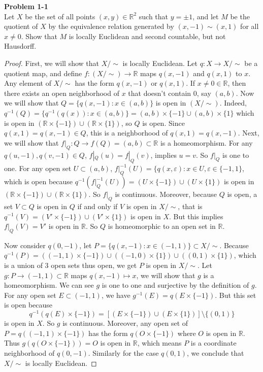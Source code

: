 \documentclass[12pt, a4paper]{article}
\theoremstyle{plain}
\newcommand{\R}{\mathbb{R}}
\def\epsilon{\varepsilon}
\newenvironment{problem}[2][Problem]
    { \begin{mdframed}[backgroundcolor=gray!20] \textbf{#1 #2} \\}
    {  \end{mdframed}}
\begin{document}
\begin{problem}{1-1}
    Let $X$ be the set of all points $(x,y)\in \R^2$ such that $y=\pm1$, and let $M$ be the quotient of $X$ by the equivalence relation generated by $(x,-1)\sim (x,1)$ for all $x\neq 0$. Show that $M$ is locally Euclidean and second countable, but not Hausdorff.
\end{problem}
\begin{proof}
	First, we will show that $X/\sim$ is locally Euclidean. Let $q: X\rightarrow X/\sim$ be a quotient map, and define $f:(X/\sim) \rightarrow \R$ maps $q(x,-1)$ and $q(x,1)$ to $x$. Any element of $X/\sim$ has the form $q(x,-1)$ or $q(x,1)$. If $x\neq 0\in \R$, then there exists an open neighborhood of $x$ that doesn't contain $0$, say $(a,b)$. Now we will show that $Q=\{q(x,-1):x\in (a,b)\}$ is open in $(X/\sim)$. Indeed, $q^{-1}(Q)=\{q^{-1}(q(x)):x\in (a,b)\}=(a,b)\times\{-1\}\cup (a,b)\times \{1\}$ which is open in $(\R\times \{-1\})\cup (\R\times \{1\})$, so $Q$ is open. Since $q(x,1)=q(x,-1)\in Q$, this is a neighborhood of $q(x,1)=q(x,-1)$. Next, we will show that $f|_Q:Q\rightarrow f(Q)=(a,b)\subset \R$ is a homeomorphism. For any $q(u,-1),q(v,-1)\in Q$, $f|_Q(u)=f|_Q(v)$, implies $u=v$. So $f|_Q$ is one to one. For any open set $U\subset (a,b)$, $f|_Q^{-1}(U)= \{q(x,\epsilon):x\in U, \epsilon\in\{-1,1\}$, which is open because $q^{-1}(f|_Q^{-1}(U))=(U\times\{-1\})\cup (U\times\{1\})$ is open in $(\R\times \{-1\})\cup (\R\times \{1\})$. So $f|_Q$ is continuous. Moreover, because $Q$ is open, a set $V\subset Q$ is open in $Q$ if and only if $V$ is open in $X/\sim$, that is $q^{-1}(V)=(V'\times \{-1\})\cup (V'\times \{1\})$ is open in $X$. But this implies $f|_Q(V)=V'$ is open in $\R$. So $Q$ is homeomorphic to an open set in $\R$.
	
	Now consider $q(0,-1)$, let $P=\{q(x,-1):x\in (-1,1)\}\subset X/\sim$. Because $q^{-1}(P)=((-1,1)\times\{-1\})\cup ((-1,0)\times \{1\})\cup((0,1)\times \{1\})$, which is a union of 3 open sets thus open, we get $P$ is open in $X/\sim$. Let $g:P\rightarrow (-1,1)\subset \R$ maps $q(x,-1)\mapsto x$, we will show that $g$ is a homeomorphism. We can see $g$ is one to one and surjective by the definition of $g$. For any open set $E\subset (-1,1)$, we have $g^{-1}(E)=q(E\times\{-1\})$. But this set is open because 
	\[
	q^{-1}(q(E)\times\{-1\})=[(E\times\{-1\})\cup (E\times\{1\})]\setminus \{(0,1)\}
	\]
	is open in $X$. So $g$ is continuous. Moreover, any open set of $P=q((-1,1)\times \{-1\})$ has the form $q(O\times \{-1\})$ where $O$ is open in $\R$. Thus $g(q(O\times \{-1\}))=O$ is open in $\R$, which means $P$ is a coordinate neighborhood of $q(0,-1)$. Similarly for the case $q(0,1)$, we conclude that $X/\sim$ is locally Euclidean.
	

\end{proof}
\end{document}
